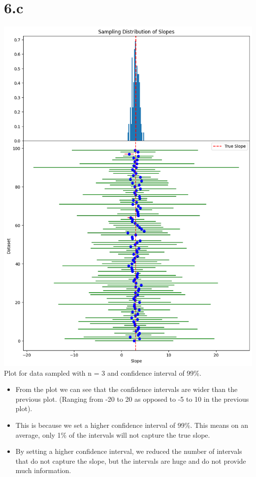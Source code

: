 \documentclass[12pt]{article}
\begin{document}
\newpage
\section*{6.c}
\includegraphics*[width=\linewidth]{graph6c}
Plot for data sampled with n = 3 and confidence interval of 99\%.
\begin{itemize}
    \item From the plot we can see that the confidence intervals are wider than
    the previous plot. (Ranging from -20 to 20 as opposed to -5 to 10 in the
    previous plot).
    \item This is because we set a higher confidence interval of 99\%. This
    means on an average, only 1\% of the intervals will not capture the true slope.
    \item By setting a higher confidence interval, we reduced the number of intervals
    that do not capture the slope, but the intervals are huge and do not provide
    much information.
\end{itemize}
\end{document}
